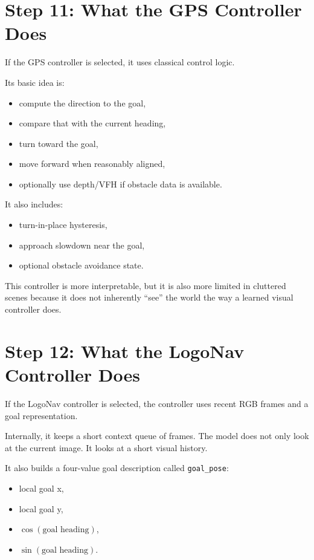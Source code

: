 \documentclass[11pt]{article}
\begin{document}
\section*{Step 11: What the GPS Controller Does}
If the GPS controller is selected, it uses classical control logic.

Its basic idea is:
\begin{itemize}[leftmargin=*]
\item compute the direction to the goal,
\item compare that with the current heading,
\item turn toward the goal,
\item move forward when reasonably aligned,
\item optionally use depth/VFH if obstacle data is available.
\end{itemize}

It also includes:
\begin{itemize}[leftmargin=*]
\item turn-in-place hysteresis,
\item approach slowdown near the goal,
\item optional obstacle avoidance state.
\end{itemize}

This controller is more interpretable, but it is also more limited in cluttered scenes because it does not inherently ``see'' the world the way a learned visual controller does.

\section*{Step 12: What the LogoNav Controller Does}
If the LogoNav controller is selected, the controller uses recent RGB frames and a goal representation.

Internally, it keeps a short context queue of frames.
The model does not only look at the current image.
It looks at a short visual history.

It also builds a four-value goal description called \texttt{goal\_pose}:
\begin{itemize}[leftmargin=*]
\item local goal x,
\item local goal y,
\item \(\cos(\text{goal heading})\),
\item \(\sin(\text{goal heading})\).
\end{itemize}
\end{document}
